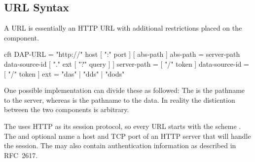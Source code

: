 \documentclass[justify]{nasa-ese}
\begin{document}
\subsection{URL Syntax}
\label{sec-url-syntax}
A \DAP \ac{URL} is essentially an \ac{HTTP} \ac{URL}\cite{rfc2616} with
additional restrictions placed on the  component.

\begin{vcode}{cft}
DAP-URL        =  "http://" host [ ":" port ] [ abs-path ]
abs-path       =  server-path data-source-id [ "." ext [ "?" query ] ] 
server-path    =  [ "/" token ] 
data-source-id =  [ "/" token ] 
ext            =  "das" | "dds" | "dods" 
\end{vcode}

One possible implementation can divide these as followed: The
 is the pathname to the server, whereas
 is the pathname to the data. In reality the
disticntion between the two components is arbitrary.

The \DAP uses \ac{HTTP} as its session protocol\cite{stevens:unp},
so every \DAP \ac{URL} starts with the scheme
. The  and optional  name a host and
TCP port of an \ac{HTTP} server that will handle the session. The
 may also contain authentication information as described in
RFC~2617\cite{rfc2617}.
\end{document}
